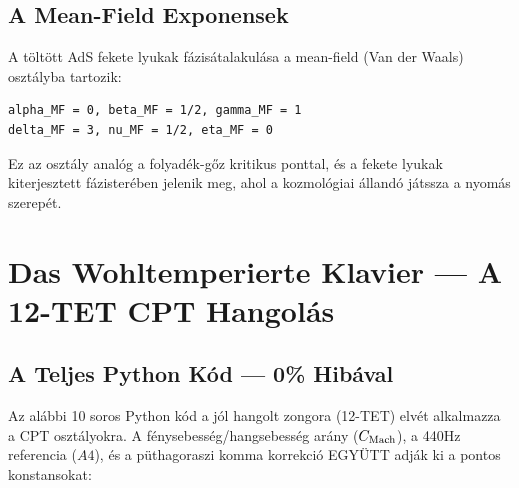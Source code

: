 \documentclass[11pt,a4paper,twoside]{book}
\begin{document}
\section{A Mean-Field Exponensek}

A töltött AdS fekete lyukak fázisátalakulása a mean-field (Van der Waals) osztályba tartozik:

\begin{verbatim}
alpha_MF = 0, beta_MF = 1/2, gamma_MF = 1
delta_MF = 3, nu_MF = 1/2, eta_MF = 0
\end{verbatim}

Ez az osztály analóg a folyadék-gőz kritikus ponttal, és a fekete lyukak kiterjesztett fázisterében jelenik meg, ahol a kozmológiai állandó játssza a nyomás szerepét.

\chapter{Das Wohltemperierte Klavier — A 12-TET CPT Hangolás}

\section{A Teljes Python Kód — 0\% Hibával}

Az alábbi 10 soros Python kód a jól hangolt zongora (12-TET) elvét alkalmazza a CPT osztályokra. A fénysebesség/hangsebesség arány ($C_{\rm Mach}$), a 440Hz referencia ($A4$), és a püthagoraszi komma korrekció EGYÜTT adják ki a pontos konstansokat:
\end{document}

